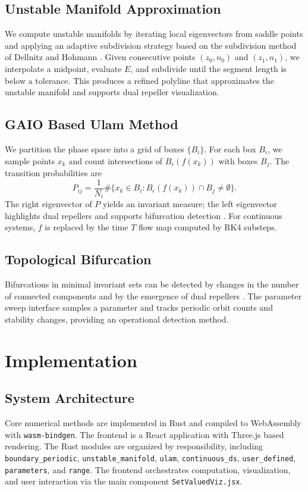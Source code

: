 \documentclass[11pt,twocolumn]{article}
\begin{document}
\subsection{Unstable Manifold Approximation}
We compute unstable manifolds by iterating local eigenvectors from saddle points and applying an adaptive subdivision strategy based on the subdivision method of Dellnitz and Hohmann \cite{dellnitz1997}. Given consecutive points $(z_0, n_0)$ and $(z_1, n_1)$, we interpolate a midpoint, evaluate $E$, and subdivide until the segment length is below a tolerance. This produces a refined polyline that approximates the unstable manifold and supports dual repeller visualization.

\subsection{GAIO Based Ulam Method}
We partition the phase space into a grid of boxes $\{B_i\}$. For each box $B_i$, we sample points $x_k$ and count intersections of $B_{\epsilon}(f(x_k))$ with boxes $B_j$. The transition probabilities are
\begin{equation}
P_{ij} = \frac{1}{N_i} \#\{x_k \in B_i : B_{\epsilon}(f(x_k)) \cap B_j \ne \emptyset\}.
\end{equation}
The right eigenvector of $P$ yields an invariant measure; the left eigenvector highlights dual repellers and supports bifurcation detection \cite{dellnitz2001,ulam1960}. For continuous systems, $f$ is replaced by the time $T$ flow map computed by RK4 substeps.

\subsection{Topological Bifurcation}
Bifurcations in minimal invariant sets can be detected by changes in the number of connected components and by the emergence of dual repellers \cite{lamb2015,lamb2025}. The parameter sweep interface samples a parameter and tracks periodic orbit counts and stability changes, providing an operational detection method.

\section{Implementation}
\subsection{System Architecture}
Core numerical methods are implemented in Rust and compiled to WebAssembly with \texttt{wasm-bindgen}. The frontend is a React application with Three.js based rendering. The Rust modules are organized by responsibility, including \texttt{boundary\_periodic}, \texttt{unstable\_manifold}, \texttt{ulam}, \texttt{continuous\_ds}, \texttt{user\_defined}, \texttt{parameters}, and \texttt{range}. The frontend orchestrates computation, visualization, and user interaction via the main component \texttt{SetValuedViz.jsx}.
\end{document}
